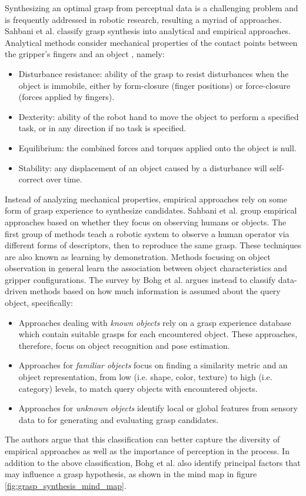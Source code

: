 Synthesizing an optimal grasp from perceptual data is a challenging problem and is frequently addressed in
robotic research, resulting a myriad of approaches. Sahbani et al. \cite{Sahbani2012} classify grasp synthesis
into analytical and empirical approaches. Analytical methods consider mechanical properties of the contact
points between the gripper's fingers and an object \cite{Roa2015,Sahbani2012,Shimoga1996}, namely:
\begin{itemize}
\item Disturbance resistance: ability of the grasp to resist disturbances when the object is immobile, either by
form-closure (finger positions) or force-closure (forces applied by fingers).
\item Dexterity: ability of the robot hand to move the object to perform a specified task, or in any direction if
no task is specified.
\item Equilibrium: the combined forces and torques applied onto the object is null.
\item Stability: any displacement of an object caused by a disturbance will self-correct over time.
\end{itemize}
Instead of analyzing mechanical properties, empirical approaches rely on some form of grasp experience to synthesize
candidates. Sahbani et al. \cite{Sahbani2012} group empirical approaches based on whether they focus on observing humans
or objects. The first group of methods teach a robotic system to observe a human operator via different forms of
descriptors, then to reproduce the same grasp. These techniques are also known as learning by demonstration.
Methods focusing on object observation in general learn the association between object characteristics and gripper
configurations. The survey by Bohg et al. \cite{Bohg2014} argues instead to classify data-driven methods based on how
much information is assumed about the query object, specifically:
\begin{itemize}
    \item Approaches dealing with \emph{known objects} rely on a grasp experience database which contain suitable grasps
    for each encountered object. These approaches, therefore, focus on object recognition and pose estimation.
    \item Approaches for \emph{familiar objects} focus on finding a similarity metric and an object representation,
    from low (i.e. shape, color, texture) to high (i.e. category) levels, to match query objects with encountered
    objects.
    \item Approaches for \emph{unknown objects} identify local or global features from sensory data to for generating
    and evaluating grasp candidates.
\end{itemize}
The authors argue that this classification can better capture the diversity of empirical approaches as well as
the importance of perception in the process. In addition to the above classification, Bohg et al. \cite{Bohg2014}
also identify principal factors that may influence a grasp hypothesis, as shown in the mind map in figure
\ref{fig:grasp_synthesis_mind_map}.

